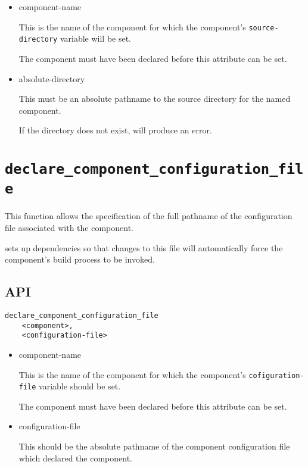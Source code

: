 \begin{itemize}
\item component-name

  This is the name of the component for which the component's
  \texttt{source-directory} variable will be set.

  The component must have been declared before this attribute can be
  set.

\item absolute-directory

  This must be an absolute pathname to the source directory for the
  named component.

  If the directory does not exist, \lmsbw will produce an error.
\end{itemize}

\section{\texttt{declare\_component\_configuration\_file}}\label{api:configuration-file}

This function allows the specification of the full pathname of the
configuration file associated with the component.

\lmsbw sets up dependencies so that changes to this file will
automatically force the component's build process to be invoked.

\subsection{API}

\begin{verbatim}
declare_component_configuration_file
    <component>,
    <configuration-file>
\end{verbatim}

\begin{itemize}
\item component-name

  This is the name of the component for which the component's
  \texttt{cofiguration-file} variable should be set.

  The component must have been declared before this attribute can be
  set.

\item configuration-file

  This should be the absolute pathname of the component configuration
  file which declared the component.

\end{itemize}


